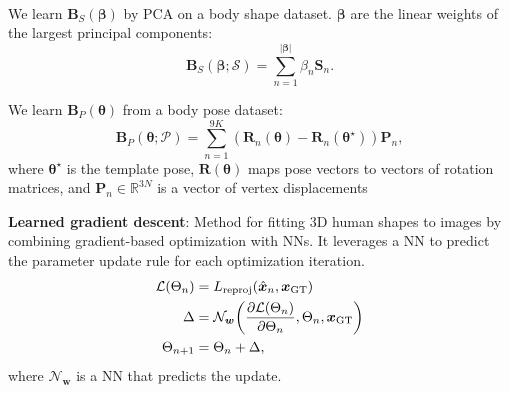 \documentclass{article}
\newcommand{\lft}{\mathopen{}\mathclose\bgroup\left}
\newcommand{\rgt}{\aftergroup\egroup\right}
\newcommand{\R}{\mathbb{R}}
\renewcommand{\vec}[1]{\bm{#1}}
\newcommand{\mat}[1]{\bm{#1}}
\newenvironment{topic}[1]
{\textbf{\sffamily \colorbox{black}{\rlap{\textbf{\textcolor{white}{#1}}}\hspace{\linewidth}\hspace{-2\fboxsep}}} \\ \vspace{0.2cm}}
{}
\begin{document}
\begin{multicols*}{2}
\begin{topic}{Parametric human body models}
        We learn $\mat{B}_S(\vec{\beta})$ by PCA on a body shape dataset. $\vec{\beta}$ are the linear
        weights of the largest principal components: \[
            \mat{B}_S(\vec{\beta}; \mathcal{S}) = \sum_{n=1}^{|\vec{\beta}|} \beta_n \mat{S}_n.
        \]

        We learn $\mat{B}_P(\vec{\theta})$ from a body pose dataset: \[
            \mat{B}_P(\vec{\theta}; \mathcal{P}) = \sum_{n=1}^{9K} (\mat{R}_n(\vec{\theta}) - \mat{R}_n(\vec{\theta}^\star)) \mat{P}_n,
        \]
        where $\vec{\theta}^\star$ is the template pose, $\mat{R}(\vec{\theta})$ maps pose vectors to
        vectors of rotation matrices, and $\mat{P}_n \in \R^{3N}$ is a vector of vertex displacements

        \textbf{Learned gradient descent}: Method for fitting 3D human shapes to images by combining
        gradient-based optimization with NNs. It leverages a NN to predict
        the parameter update rule for each optimization iteration.
        \begin{align*}
            \mathcal{L}(\Theta_n) & = L_{\mathrm{reproj}}(\hat{\vec{x}}_n, \vec{x}_{\mathrm{GT}})                                             \\
            \Delta                & = \mathcal{N}_{\vec{w}}\lft( \pdv{\mathcal{L}(\Theta_n)}{\Theta_n}, \Theta_n, \vec{x}_{\mathrm{GT}} \rgt) \\
            \Theta_{n+1}          & = \Theta_n + \Delta,
        \end{align*}
        where $\mathcal{N}_{\vec{w}}$ is a NN that predicts the update.
    \end{topic}

\end{multicols*}
\end{document}
